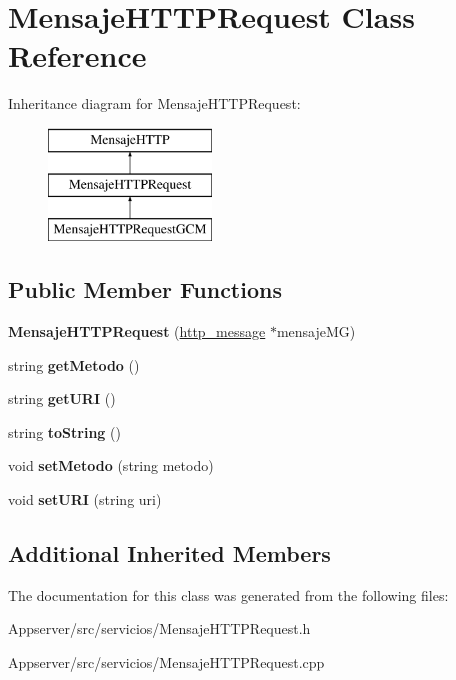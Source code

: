 \hypertarget{classMensajeHTTPRequest}{}\section{Mensaje\+H\+T\+T\+P\+Request Class Reference}
\label{classMensajeHTTPRequest}
Inheritance diagram for Mensaje\+H\+T\+T\+P\+Request\+:\begin{figure}[H]
\begin{center}
\leavevmode
\includegraphics[height=3.000000cm]{classMensajeHTTPRequest}
\end{center}
\end{figure}
\subsection*{Public Member Functions}
\begin{DoxyCompactItemize}
\item 
{\bfseries Mensaje\+H\+T\+T\+P\+Request} (\hyperlink{structhttp__message}{http\+\_\+message} $\ast$mensaje\+MG)\hypertarget{classMensajeHTTPRequest_a0d073186e943c4495fd6d3d9d9422fa5}{}\label{classMensajeHTTPRequest_a0d073186e943c4495fd6d3d9d9422fa5}

\item 
string {\bfseries get\+Metodo} ()\hypertarget{classMensajeHTTPRequest_a977e087f696316a18d66c0caf6efbd96}{}\label{classMensajeHTTPRequest_a977e087f696316a18d66c0caf6efbd96}

\item 
string {\bfseries get\+U\+RI} ()\hypertarget{classMensajeHTTPRequest_a29e2bd2380e8f4e3be66a4695af60c82}{}\label{classMensajeHTTPRequest_a29e2bd2380e8f4e3be66a4695af60c82}

\item 
string {\bfseries to\+String} ()\hypertarget{classMensajeHTTPRequest_a7b1f874c87b76188e7c76eeea5b9e281}{}\label{classMensajeHTTPRequest_a7b1f874c87b76188e7c76eeea5b9e281}

\item 
void {\bfseries set\+Metodo} (string metodo)\hypertarget{classMensajeHTTPRequest_a3ecb30dba9bb014cde0599f4c3950743}{}\label{classMensajeHTTPRequest_a3ecb30dba9bb014cde0599f4c3950743}

\item 
void {\bfseries set\+U\+RI} (string uri)\hypertarget{classMensajeHTTPRequest_a3dc7c23432fd17d0a5d820e05eff0708}{}\label{classMensajeHTTPRequest_a3dc7c23432fd17d0a5d820e05eff0708}

\end{DoxyCompactItemize}
\subsection*{Additional Inherited Members}


The documentation for this class was generated from the following files\+:\begin{DoxyCompactItemize}
\item 
Appserver/src/servicios/Mensaje\+H\+T\+T\+P\+Request.\+h\item 
Appserver/src/servicios/Mensaje\+H\+T\+T\+P\+Request.\+cpp\end{DoxyCompactItemize}
